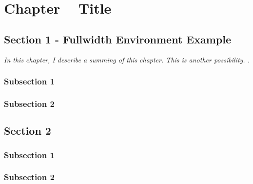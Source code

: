 
\chapter{Chapter \thechapter ~ Title}
\label{ch:two}


\section{Section 1 - Fullwidth Environment Example}

\begin{fullwidth}
\textit{In this chapter, I describe a summing of this chapter. This is another possibility. \lipsum[1].} \newline
\end{fullwidth}

\subsection{Subsection 1}

\lipsum[6-7]

\subsection{Subsection 2}

\lipsum[7-8]


\section{Section 2}

\subsection{Subsection 1}

\lipsum[9-10]

\subsection{Subsection 2}

\lipsum[11-12]
